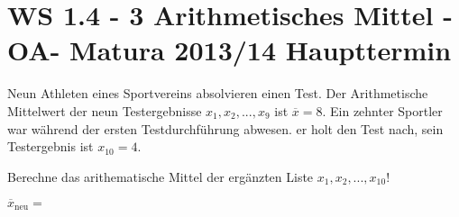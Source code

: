 \section{WS 1.4 - 3 Arithmetisches Mittel - OA- Matura 2013/14 Haupttermin}

\begin{beispiel}[WS 1.4]{1} %
				Neun Athleten eines Sportvereins absolvieren einen Test. Der Arithmetische Mittelwert der neun Testergebnisse $x_1,x_2,...,x_9$ ist $\overline{x}=8$. Ein zehnter Sportler war während der ersten Testdurchführung abwesen. er holt den Test nach, sein Testergebnis ist $x_{10}=4$.
				
				Berechne das arithematische Mittel der ergänzten Liste $x_1,x_2,...,x_{10}$!\leer
				
				$\overline{x}_\text{neu}=$ 
\end{beispiel}